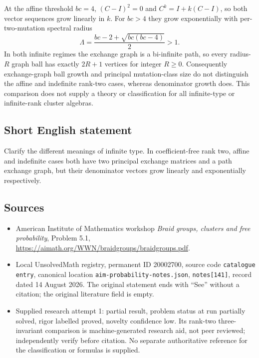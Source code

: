 \documentclass[11pt]{article}
\begin{document}
At the affine threshold $bc=4$, $(C-I)^2=0$ and $C^k=I+k(C-I)$, so both vector sequences grow linearly in $k$. For $bc>4$ they grow exponentially with per-two-mutation spectral radius
\[
 \Lambda=\frac{bc-2+\sqrt{bc(bc-4)}}2>1.
\]
In both infinite regimes the exchange graph is a bi-infinite path, so every radius-$R$ graph ball has exactly $2R+1$ vertices for integer $R\ge0$. Consequently exchange-graph ball growth and principal mutation-class size do not distinguish the affine and indefinite rank-two cases, whereas denominator growth does. This comparison does not supply a theory or classification for all infinite-type or infinite-rank cluster algebras.
\subsection{Short English statement}
Clarify the different meanings of infinite type. In coefficient-free rank two, affine and indefinite cases both have two principal exchange matrices and a path exchange graph, but their denominator vectors grow linearly and exponentially respectively.
\subsection{Sources}
\begin{itemize}
\item American Institute of Mathematics workshop \emph{Braid groups, clusters and free probability}, Problem 5.1, \url{https://aimath.org/WWN/braidgroups/braidgroups.pdf}.
\item Local UnsolvedMath registry, permanent ID 20002700, source code \texttt{catalogue entry}, canonical location \texttt{aim-probability-notes.json}, \texttt{notes[141]}, record dated 14 August 2026. The original statement ends with ``See'' without a citation; the original literature field is empty.
\item Supplied research attempt 1: partial result, problem status at run partially solved, rigor labelled proved, novelty confidence low. Its rank-two three-invariant comparison is machine-generated research aid, not peer reviewed; independently verify before citation. No separate authoritative reference for the classification or formulas is supplied.
\end{itemize}
\end{document}
